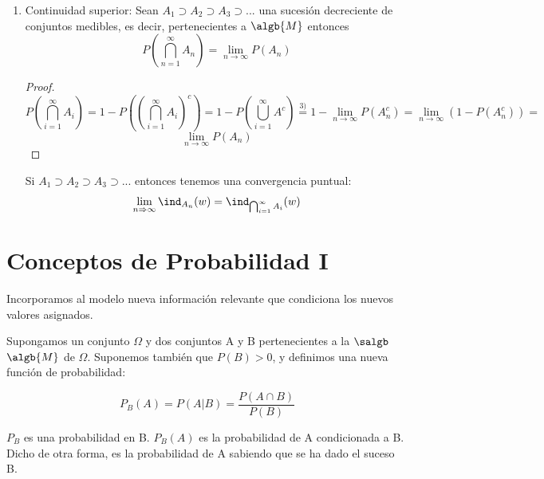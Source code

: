 \documentclass{apuntes}
\begin{document}
\begin{enumerate}
\begin{proof}
Entonces: 
\[P(\lim_{n \rightarrow \infty}A_n)=P(\bigcup_{n=1}^{\infty}A_n)=P(\bigcup_{n=1}^{\infty}D_n)=\sum_{n=1}^{\infty}P(D_n)=\lim_{n \rightarrow \infty}\sum_{i=1}^{n}P(D_i)=\lim_{n \rightarrow \infty}P(\bigcup_{i=1}^{n}D_i) =
\]
\[
=\lim_{n \rightarrow \infty}P(A_n)
\]
\end{proof} 

\obs De esta propiedad podemos afirmar lo siguiente: \[ \bigcup_{n=1}^{\infty}A_n = \lim_{n \rightarrow \infty} A_n \Rightarrow P(\lim_{n \rightarrow \infty} A_n) = \lim_{n \rightarrow \infty} P(A_n)
\]
\obs Si $A_1 \subset A_2 \subset A_3 \subset...$ entonces tenemos una convergencia puntual:
\[
\lim_{n \Rightarrow \infty}\ind_{A_n}(w) = \ind_{\bigcup_{i=1}^{\infty}A_i}(w)
\]

\item Continuidad superior: Sean $A_1 \supset A_2 \supset A_3 \supset ...$ una sucesión decreciente de conjuntos medibles, es decir, pertenecientes a $\algb{M}$ entonces 
\[ P(\bigcap_{n=1}^{\infty}A_n) = \lim_{n \rightarrow \infty} P(A_n)
\]

\begin{proof}
\[P(\bigcap_{i=1}^{\infty}A_i) = 1-P\left((\bigcap_{i=1}^{\infty}A_i)^c\right)=1-P(\bigcup_{i=1}^{\infty}A^c) \stackrel{3)}{=} 1-\lim_{n \rightarrow \infty}P(A_n^c)=\lim_{n \rightarrow \infty}(1-P(A_n^c)) = 
\]
\[
\lim_{n \rightarrow \infty}P(A_n)
\]
\end{proof}

\obs Si $A_1 \supset A_2 \supset A_3 \supset...$ entonces tenemos una convergencia puntual:
\[
\lim_{n \Rightarrow \infty}\ind_{A_n}(w) = \ind_{\bigcap_{i=1}^{\infty}A_i}(w)
\]
\end{enumerate}

\section{Conceptos de Probabilidad I}
Incorporamos al modelo nueva información relevante que condiciona los nuevos valores asignados.

\begin{defn}
Supongamos un conjunto $\Omega$ y dos conjuntos A y B pertenecientes a la $\salgb$ $\algb{M}$ de $\Omega$. Suponemos también que $P(B)>0$, y definimos una nueva función de probabilidad:

\[ P_B(A) = P(A | B) = \frac{P(A \cap B)}{P(B)}\]

$P_B$ es una probabilidad en B. $P_B(A)$ es la probabilidad de A condicionada a B. Dicho de otra forma, es la probabilidad de A sabiendo que se ha dado el suceso B.
\end{defn}
\end{document}
